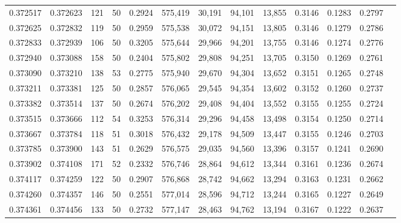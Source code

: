 \begin{tabular}{rrrrrrrrrrrrr}
0.372517 & 0.372623 &   121 &  50 &                                     0.2924 & 575,419 &  30,191 &  94,101 &  13,855 & 0.3146 & 0.1283 & 0.2797 \\
0.372625 & 0.372832 &   119 &  50 &                                     0.2959 & 575,538 &  30,072 &  94,151 &  13,805 & 0.3146 & 0.1279 & 0.2786 \\
0.372833 & 0.372939 &   106 &  50 &                                     0.3205 & 575,644 &  29,966 &  94,201 &  13,755 & 0.3146 & 0.1274 & 0.2776 \\
0.372940 & 0.373088 &   158 &  50 &                                     0.2404 & 575,802 &  29,808 &  94,251 &  13,705 & 0.3150 & 0.1269 & 0.2761 \\
0.373090 & 0.373210 &   138 &  53 &                                     0.2775 & 575,940 &  29,670 &  94,304 &  13,652 & 0.3151 & 0.1265 & 0.2748 \\
0.373211 & 0.373381 &   125 &  50 &                                     0.2857 & 576,065 &  29,545 &  94,354 &  13,602 & 0.3152 & 0.1260 & 0.2737 \\
0.373382 & 0.373514 &   137 &  50 &                                     0.2674 & 576,202 &  29,408 &  94,404 &  13,552 & 0.3155 & 0.1255 & 0.2724 \\
0.373515 & 0.373666 &   112 &  54 &                                     0.3253 & 576,314 &  29,296 &  94,458 &  13,498 & 0.3154 & 0.1250 & 0.2714 \\
0.373667 & 0.373784 &   118 &  51 &                                     0.3018 & 576,432 &  29,178 &  94,509 &  13,447 & 0.3155 & 0.1246 & 0.2703 \\
0.373785 & 0.373900 &   143 &  51 &                                     0.2629 & 576,575 &  29,035 &  94,560 &  13,396 & 0.3157 & 0.1241 & 0.2690 \\
0.373902 & 0.374108 &   171 &  52 &                                     0.2332 & 576,746 &  28,864 &  94,612 &  13,344 & 0.3161 & 0.1236 & 0.2674 \\
0.374117 & 0.374259 &   122 &  50 &                                     0.2907 & 576,868 &  28,742 &  94,662 &  13,294 & 0.3163 & 0.1231 & 0.2662 \\
0.374260 & 0.374357 &   146 &  50 &                                     0.2551 & 577,014 &  28,596 &  94,712 &  13,244 & 0.3165 & 0.1227 & 0.2649 \\
0.374361 & 0.374456 &   133 &  50 &                                     0.2732 & 577,147 &  28,463 &  94,762 &  13,194 & 0.3167 & 0.1222 & 0.2637 \\

\end{tabular}
